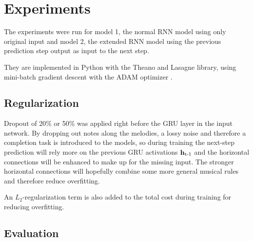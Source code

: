 \section{Experiments}
\label{sec:experiments}


The experiments were run for model 1, the normal RNN model using only original input and model 2, the extended RNN model using the previous prediction step output as input to the next step.

They are implemented in Python with the Theano and Lasagne library, using mini-batch gradient descent with the ADAM optimizer \cite{Kingma2014c}.  

\subsection{Regularization} %
\label{sub:regularization}

Dropout of 20\% or 50\% was applied right before the GRU layer in the input network. By dropping out notes along the melodies, a lossy noise and therefore a completion task is introduced to the models, so during training the next-step prediction will rely more on the previous GRU activations $\bm{\mathrm{h}}_{\text{t-1}}$ and the horizontal connections will be enhanced to make up for the missing input. The stronger horizontal connections will hopefully combine some more general musical rules and therefore reduce overfitting. 

An $L_2$-regularization term is also added to the total cost during training for reducing overfitting.



\subsection{Evaluation}

